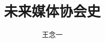 \documentclass{paper}
\begin{document}
\setlength{\droptitle}{-.5in}
\setlength{\parindent}{0pt}
\setlength{\parskip}{4pt}

\title{未来媒体协会史}
\author{王念一}
\maketitle

\tableofcontents




\end{document}
